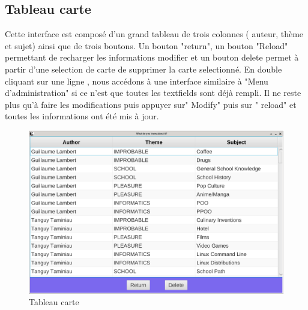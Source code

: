 \newpage
\subsection{Tableau carte}
Cette interface est composé d'un grand tableau de trois colonnes ( auteur, thème et sujet) ainsi que de trois 
boutons. Un bouton "return", un bouton "Reload" permettant de recharger les informations modifier et un bouton 
delete permet à partir d'une selection de carte de supprimer la carte selectionné. En double cliquant sur une 
ligne , nous accédons à une interface similaire à "Menu d'administration" si ce n'est que toutes les 
textfields sont déjà rempli. Il ne reste plus qu'à faire les modifications puis appuyer sur" Modify" puis sur "
reload" et toutes les informations ont été mis à jour.

\begin{figure}[h]
	\centering
	\includegraphics[width=\textwidth]{tablecard.png}
	\caption{Tableau carte}
	\label{fig:tablecard}
\end{figure}
